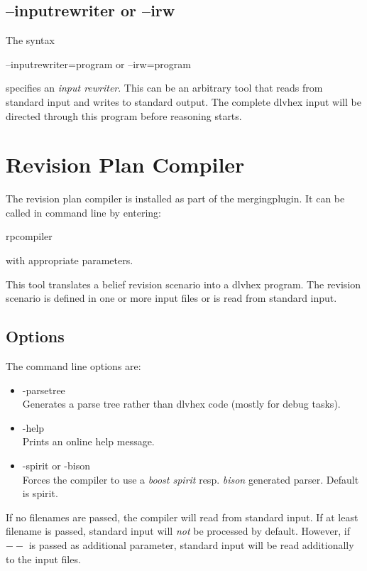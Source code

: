 \documentclass[a4paper,11pt]{article}
\theoremstyle{definition}
\newcommand{\dlvhex}{\textsf{dlvhex}\xspace }
\newcommand{\inlinecode}[1]{\textsf{#1}\xspace }
\begin{document}
			
		\subsection{\inlinecode{--inputrewriter} or \inlinecode{--irw}}

			The syntax
			\begin{center}
				\inlinecode{--inputrewriter=program} or \inlinecode{--irw=program}
			\end{center}
			specifies an \emph{input rewriter}. This can be an arbitrary tool that reads from standard input and writes to standard output. The complete \dlvhex input will be
			directed through this program before reasoning starts.

			
	\section{Revision Plan Compiler}
	\label{sec:RPCompiler}
	
		The revision plan compiler is installed as part of the mergingplugin. It can be called in command line by entering:
		\begin{center}
			\inlinecode{rpcompiler}
		\end{center}
		with appropriate parameters.

		This tool translates a belief revision scenario into a \dlvhex program. The revision scenario is defined in one or more input files or is read from standard input.
		

		\subsection{Options}
		\label{sec:RPCompiler:Options}

			The command line options are:
			\begin{itemize}
				\item \inlinecode{-parsetree} \\
						Generates a parse tree rather than dlvhex code (mostly for debug tasks).
				\item \inlinecode{-help} \\
						Prints an online help message.
				\item \inlinecode{-spirit} or \inlinecode{-bison} \\
						Forces the compiler to use a \emph{boost spirit} resp. \emph{bison} generated parser. Default is spirit.
			\end{itemize}

			If no filenames are passed, the compiler will read from standard input. If at least filename is passed, standard input will \emph{not} be processed by default.
			However, if $--$ is passed as additional parameter, standard input will be read additionally to the input files.
\end{document}

